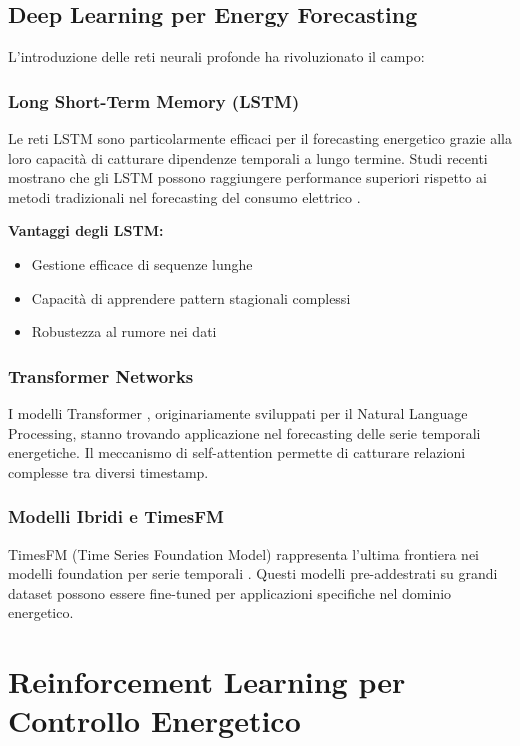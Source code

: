 \documentclass[12pt,a4paper,twoside]{report}
\begin{document}
\subsection{Deep Learning per Energy Forecasting}

L'introduzione delle reti neurali profonde ha rivoluzionato il campo:

\subsubsection{Long Short-Term Memory (LSTM)}

Le reti LSTM \cite{hochreiter1997lstm} sono particolarmente efficaci per il forecasting energetico grazie alla loro capacità di catturare dipendenze temporali a lungo termine. Studi recenti mostrano che gli LSTM possono raggiungere performance superiori rispetto ai metodi tradizionali nel forecasting del consumo elettrico \cite{kong2019lstm}.

\textbf{Vantaggi degli LSTM:}
\begin{itemize}
    \item Gestione efficace di sequenze lunghe
    \item Capacità di apprendere pattern stagionali complessi
    \item Robustezza al rumore nei dati
\end{itemize}

\subsubsection{Transformer Networks}

I modelli Transformer \cite{vaswani2017attention}, originariamente sviluppati per il Natural Language Processing, stanno trovando applicazione nel forecasting delle serie temporali energetiche. Il meccanismo di self-attention permette di catturare relazioni complesse tra diversi timestamp.

\subsubsection{Modelli Ibridi e TimesFM}

TimesFM (Time Series Foundation Model) rappresenta l'ultima frontiera nei modelli foundation per serie temporali \cite{das2024timesfm}. Questi modelli pre-addestrati su grandi dataset possono essere fine-tuned per applicazioni specifiche nel dominio energetico.

\section{Reinforcement Learning per Controllo Energetico}
\end{document}
